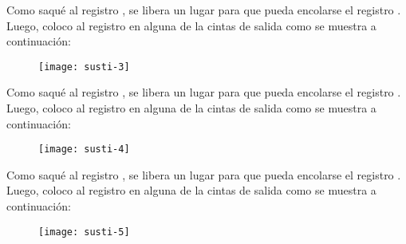 \documentclass[10pt,a4paper]{article}
\begin{document}
Como saqué al registro , se libera un lugar para que pueda encolarse el registro . Luego, coloco al registro  en alguna de la cintas de salida como se muestra a continuación:  
\newline
\newline
\begin{figure}[h]
	\centering
\texttt{[image: susti-3]}
	\label{drivers1}
\end{figure}
\newline
\newline
Como saqué al registro , se libera un lugar para que pueda encolarse el registro . Luego, coloco al registro  en alguna de la cintas de salida como se muestra a continuación:  
\newline
\newline
\begin{figure}[h]
	\centering
\texttt{[image: susti-4]}
	\label{drivers1}
\end{figure}
\newline
\newline
Como saqué al registro , se libera un lugar para que pueda encolarse el registro . Luego, coloco al registro  en alguna de la cintas de salida como se muestra a continuación:  
\newline
\newline
\begin{figure}[h]
	\centering
\texttt{[image: susti-5]}
	\label{drivers1}
\end{figure}
\newpage
\end{document}

